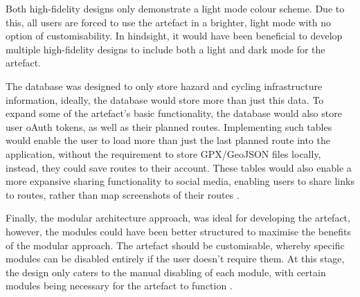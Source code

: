 Both high-fidelity designs only demonstrate a light mode colour scheme. Due to this, all users are forced to use the artefact in a brighter, light mode with no option of customisability. In hindsight, it would have been beneficial to develop multiple high-fidelity designs to include both a light and dark mode for the artefact.

The database was designed to only store hazard and cycling infrastructure information, ideally, the database would store more than just this data. To expand some of the artefact's basic functionality, the database would also store user oAuth tokens, as well as their planned routes. Implementing such tables would enable the user to load more than just the last planned route into the application, without the requirement to store GPX/GeoJSON files locally, instead, they could save routes to their account. These tables would also enable a more expansive sharing functionality to social media, enabling users to share links to routes, rather than map screenshots of their routes .

Finally, the modular architecture approach, was ideal for developing the artefact, however, the modules could have been better structured to maximise the benefits of the modular approach. The artefact should be customisable, whereby specific modules can be disabled entirely if the user doesn't require them. At this stage, the design only caters to the manual disabling of each module, with certain modules being necessary for the artefact to function .